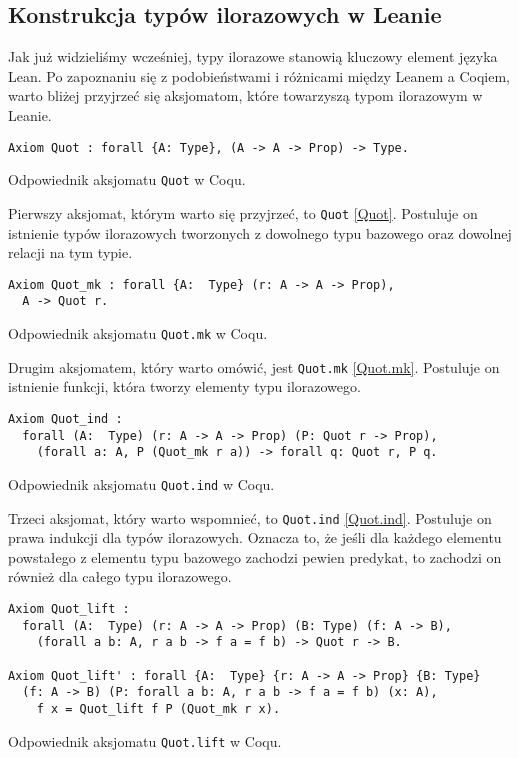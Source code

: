 \subsection{Konstrukcja typów ilorazowych w Leanie}
Jak już widzieliśmy wcześniej, typy ilorazowe stanowią kluczowy element języka Lean. Po zapoznaniu się z podobieństwami i różnicami między Leanem a Coqiem, warto bliżej przyjrzeć się aksjomatom, które towarzyszą typom ilorazowym w Leanie.
\begin{code}
\begin{verbatim}
Axiom Quot : forall {A: Type}, (A -> A -> Prop) -> Type.
\end{verbatim}
\caption{Odpowiednik aksjomatu \texttt{Quot} w Coqu.}
\label{Quot}
\end{code}

Pierwszy aksjomat, którym warto się przyjrzeć, to \texttt{Quot} \ref{Quot}. Postuluje on istnienie typów ilorazowych tworzonych z dowolnego typu bazowego oraz dowolnej relacji na tym typie.
\begin{code}
\begin{verbatim}
Axiom Quot_mk : forall {A:  Type} (r: A -> A -> Prop),
  A -> Quot r.
\end{verbatim}
\caption{Odpowiednik aksjomatu \texttt{Quot.mk} w Coqu.}
\label{Quot.mk}
\end{code}

Drugim aksjomatem, który warto omówić, jest \texttt{Quot.mk} \ref{Quot.mk}. Postuluje on istnienie funkcji, która tworzy elementy typu ilorazowego.
\begin{code}
\begin{verbatim}
Axiom Quot_ind : 
  forall (A:  Type) (r: A -> A -> Prop) (P: Quot r -> Prop),
    (forall a: A, P (Quot_mk r a)) -> forall q: Quot r, P q.
\end{verbatim}
\caption{Odpowiednik aksjomatu \texttt{Quot.ind} w Coqu.}
\label{Quot.ind}
\end{code}

Trzeci aksjomat, który warto wspomnieć, to \texttt{Quot.ind} \ref{Quot.ind}. Postuluje on prawa indukcji dla typów ilorazowych. Oznacza to, że jeśli dla każdego elementu powstałego z elementu typu bazowego zachodzi pewien predykat, to zachodzi on również dla całego typu ilorazowego.
\begin{code}
\begin{verbatim}
Axiom Quot_lift :
  forall (A:  Type) (r: A -> A -> Prop) (B: Type) (f: A -> B),
    (forall a b: A, r a b -> f a = f b) -> Quot r -> B.

Axiom Quot_lift' : forall {A:  Type} {r: A -> A -> Prop} {B: Type} 
  (f: A -> B) (P: forall a b: A, r a b -> f a = f b) (x: A),
    f x = Quot_lift f P (Quot_mk r x).
\end{verbatim}
\caption{Odpowiednik aksjomatu \texttt{Quot.lift} w Coqu.}
\label{Quot.lift}
\end{code}

